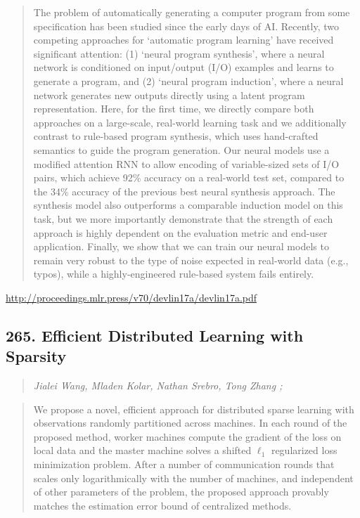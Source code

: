 \documentclass{article}
\begin{document}
\begin{quote}
    The problem of automatically generating a computer program from some specification has been studied since the early days of AI. Recently, two competing approaches for `automatic program learning’ have received significant attention: (1) `neural program synthesis’, where a neural network is conditioned on input/output (I/O) examples and learns to generate a program, and (2) `neural program induction’, where a neural network generates new outputs directly using a latent program representation. Here, for the first time, we directly compare both approaches on a large-scale, real-world learning task and we additionally contrast to rule-based program synthesis, which uses hand-crafted semantics to guide the program generation. Our neural models use a modified attention RNN to allow encoding of variable-sized sets of I/O pairs, which achieve 92\% accuracy on a real-world test set, compared to the 34\% accuracy of the previous best neural synthesis approach. The synthesis model also outperforms a comparable induction model on this task, but we more importantly demonstrate that the strength of each approach is highly dependent on the evaluation metric and end-user application. Finally, we show that we can train our neural models to remain very robust to the type of noise expected in real-world data (e.g., typos), while a highly-engineered rule-based system fails entirely.  
\end{quote}

\href{http://proceedings.mlr.press/v70/devlin17a/devlin17a.pdf}{http://proceedings.mlr.press/v70/devlin17a/devlin17a.pdf}

\subsection{265. Efficient Distributed Learning with Sparsity}

\begin{quote}
\footnotesize{\textit{Jialei Wang, Mladen Kolar, Nathan Srebro, Tong Zhang ;}}

\end{quote}

\begin{quote}
    We propose a novel, efficient approach for distributed sparse learning with observations randomly partitioned across machines. In each round of the proposed method, worker machines compute the gradient of the loss on local data and the master machine solves a shifted $\ell_1$ regularized loss minimization problem. After a number of communication rounds that scales only logarithmically with the number of machines, and independent of other parameters of the problem, the proposed approach provably matches the estimation error bound of centralized methods.  
\end{quote}
\end{document}
